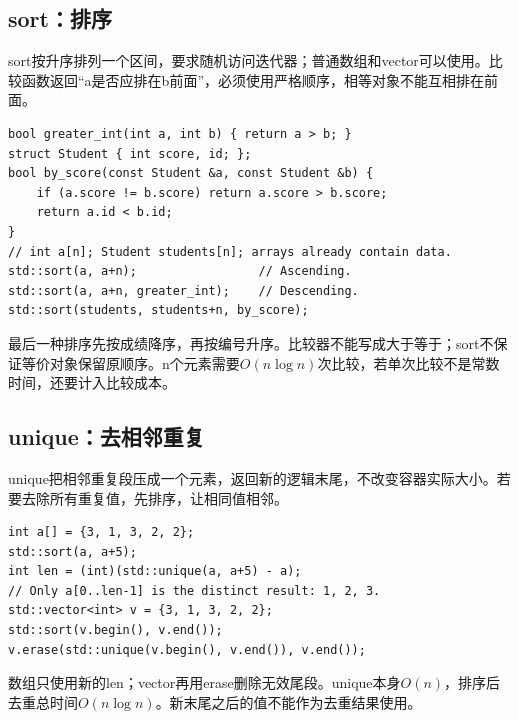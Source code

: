 \documentclass[UTF8,11pt,a4paper,fontset=none]{ctexart}
\begin{document}
\subsection{sort：排序}
sort按升序排列一个区间，要求随机访问迭代器；普通数组和vector可以使用。比较函数返回“a是否应排在b前面”，必须使用严格顺序，相等对象不能互相排在前面。
\par\noindent\begin{minipage}{\linewidth}
\begin{lstlisting}
bool greater_int(int a, int b) { return a > b; }
struct Student { int score, id; };
bool by_score(const Student &a, const Student &b) {
    if (a.score != b.score) return a.score > b.score;
    return a.id < b.id;
}
// int a[n]; Student students[n]; arrays already contain data.
std::sort(a, a+n);                 // Ascending.
std::sort(a, a+n, greater_int);    // Descending.
std::sort(students, students+n, by_score);
\end{lstlisting}
\end{minipage}\par
最后一种排序先按成绩降序，再按编号升序。比较器不能写成大于等于；sort不保证等价对象保留原顺序。n个元素需要$O(n\log n)$次比较，若单次比较不是常数时间，还要计入比较成本。

\subsection{unique：去相邻重复}
unique把相邻重复段压成一个元素，返回新的逻辑末尾，不改变容器实际大小。若要去除所有重复值，先排序，让相同值相邻。
\par\noindent\begin{minipage}{\linewidth}
\begin{lstlisting}
int a[] = {3, 1, 3, 2, 2};
std::sort(a, a+5);
int len = (int)(std::unique(a, a+5) - a);
// Only a[0..len-1] is the distinct result: 1, 2, 3.
std::vector<int> v = {3, 1, 3, 2, 2};
std::sort(v.begin(), v.end());
v.erase(std::unique(v.begin(), v.end()), v.end());
\end{lstlisting}
\end{minipage}\par
数组只使用新的len；vector再用erase删除无效尾段。unique本身$O(n)$，排序后去重总时间$O(n\log n)$。新末尾之后的值不能作为去重结果使用。
\end{document}
